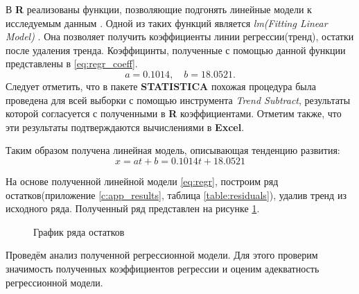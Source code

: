 В \textbf{R} реализованы функции, позволяющие подгонять линейные модели к исследуемым данным \cite{Shumway2006Time}. Одной из таких функций является \textit{lm(Fitting Linear Model)} \cite[c.178]{Kabacoff2009R}. Она позволяет получить коэффициенты линии регрессии(тренд), остатки после удаления тренда. Коэффицинты, полученные с помощью данной функции представлены в \eqref{eq:regr_coeff}.
\begin{equation}
\label{eq:regr_coeff}
	a = 0.1014, \quad b = 18.0521.
\end{equation}
Следует отметить, что в пакете \textbf{STATISTICA} похожая процедура была проведена для всей выборки с помощью инструмента \textit{Trend Subtract}, результаты которой согласуется с полученными в \textbf{R} коэффициентами. Отметим также, что эти результаты подтверждаются вычислениями в \textbf{Excel}.

Таким образом получена линейная модель, описывающая тенденцию развития:
\begin{equation}
\label{eq:regr}
	x = at + b = 0.1014t + 18.0521
\end{equation}

На основе полученной линейной модели \eqref{eq:regr}, построим ряд остатков(приложение \ref{c:app_results}, таблица \ref{table:residuals}), удалив тренд из исходного ряда. Полученный ряд представлен на рисунке \ref{img:ts_detrended}.
\begin{figure}[ht]
\caption{График ряда остатков}
\label{img:ts_detrended}
\end{figure}

Проведём анализ полученной регрессионной модели. Для этого проверим значимость полученных коэффициентов регрессии и оценим адекватность регрессионной модели.

